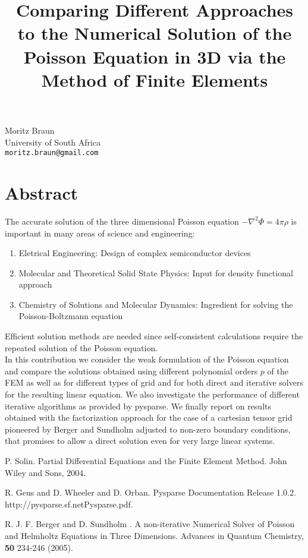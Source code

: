 \title{Comparing Different Approaches to the Numerical Solution of the Poisson Equation in 3D via the Method of Finite Elements}
 \author{} \institute{}
\maketitle
\begin{center}
{\large Moritz Braun}\\
University of South Africa\\
{\tt moritz.braun@gmail.com}

\end{center}

\section*{Abstract}

The accurate solution of the three dimensional Poisson equation 
$
-\nabla^2 \Phi = 4 \pi \rho
$
is important in many  areas of science and engineering:
\begin{enumerate}
\item Eletrical Engineering: Design of complex semiconductor devices
\item Molecular and Theoretical Solid State Physics: Input for density
functional approach
\item 
Chemistry of Solutions  and Molecular Dynamics: Ingredient for solving the Poisson-Boltzmann equation 
\end{enumerate}
Efficient solution methods are needed since self-consistent calculations
require the repeated solution of the Poisson equation.\\
In this contribution we consider the weak formulation of the Poisson equation
\cite{SolinBook} 
and compare the solutions 
obtained using  different polynomial orders $p$ of the FEM
as well as for different types of grid and for both 
direct and iterative solvers for the resulting linear equation. We also
investigate the performance of different iterative algorithms as
provided by pysparse\cite{pysparse}.
We finally  report on results obtained with  the factorization approach for the case of a cartesian tensor grid 
pioneered by Berger and Sundholm \cite{NonIterFact} adjusted to non-zero boundary conditions, that promises to allow a direct solution even for very large linear systems.


\begin{thebibliography}{10}

{\sc P. Solin}. {Partial Differential Equations and the Finite Element Method}. John Wiley and Sons, 2004.



{\sc R. Geus and D. Wheeler and D. Orban}. {Pysparse Documentation Release 1.0.2}. http://pysparse.sf.netPysparse.pdf.



{\sc R. J. F. Berger and D. Sundholm }. {A non-iterative Numerical Solver of Poisson and Helmholtz Equations in Three Dimensions}. Advances in Quantum Chemistry, {\bf 50} 234-246 (2005).

\end{thebibliography}
